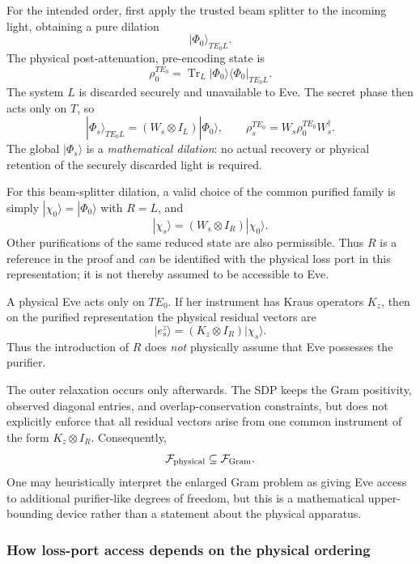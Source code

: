 \documentclass[11pt]{article}
\theoremstyle{remark}
\begin{document}
For the intended order, first apply the trusted beam splitter to the
incoming light, obtaining a pure dilation
\[
    |\Phi_0\rangle_{TE_0L}.
\]
The physical post-attenuation, pre-encoding state is
\[
    \rho_0^{TE_0}
    =
    \operatorname{Tr}_{L}
    |\Phi_0\rangle\!\langle\Phi_0|_{TE_0L}.
\]
The system \(L\) is discarded securely and unavailable to Eve.  The secret
phase then acts only on \(T\), so
\[
    |\Phi_s\rangle_{TE_0L}
    =
    (W_s\otimes I_L)|\Phi_0\rangle,
    \qquad
    \rho_s^{TE_0}=W_s\rho_0^{TE_0}W_s^\dagger.
\]
The global \(|\Phi_s\rangle\) is a \emph{mathematical dilation}: no actual
recovery or physical retention of the securely discarded light is required.

For this beam-splitter dilation, a valid choice of the common purified
family is simply \(|\chi_0\rangle=|\Phi_0\rangle\) with \(R=L\), and
\[
    |\chi_s\rangle=(W_s\otimes I_R)|\chi_0\rangle.
\]
Other purifications of the same reduced state are also permissible.
Thus \(R\) is a reference in the proof and \emph{can} be identified with
the physical loss port in this representation; it is not thereby assumed
to be accessible to Eve.

A physical Eve acts only on \(TE_0\).  If her instrument has Kraus operators
\(K_z\), then on the purified representation the physical residual vectors
are
\begin{equation}
    |e_s^z\rangle
    =
    (K_z\otimes I_R)|\chi_s\rangle.
    \label{eq:app-physical-purified-attack}
\end{equation}
Thus the introduction of \(R\) does \emph{not} physically assume that Eve
possesses the purifier.

The outer relaxation occurs only afterwards.  The SDP keeps the Gram
positivity, observed diagonal entries, and overlap-conservation constraints,
but does not explicitly enforce that all residual vectors arise from one
common instrument of the form \(K_z\otimes I_R\).  Consequently,
\[
    \mathcal F_{\rm physical}
    \subseteq
    \mathcal F_{\rm Gram}.
\]
One may heuristically interpret the enlarged Gram problem as giving Eve access
to additional purifier-like degrees of freedom, but this is a mathematical
upper-bounding device rather than a statement about the physical apparatus.

\subsubsection{How loss-port access depends on the physical ordering}
\end{document}
